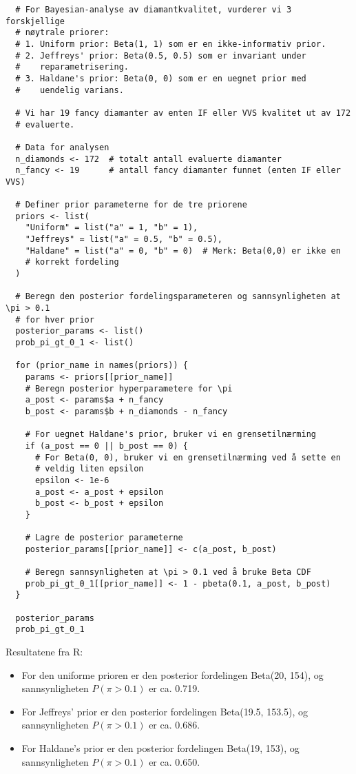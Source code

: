 \documentclass{article}
\begin{document}
\begin{verbatim}
  # For Bayesian-analyse av diamantkvalitet, vurderer vi 3 forskjellige 
  # nøytrale priorer:
  # 1. Uniform prior: Beta(1, 1) som er en ikke-informativ prior.
  # 2. Jeffreys' prior: Beta(0.5, 0.5) som er invariant under 
  #    reparametrisering.
  # 3. Haldane's prior: Beta(0, 0) som er en uegnet prior med 
  #    uendelig varians.
  
  # Vi har 19 fancy diamanter av enten IF eller VVS kvalitet ut av 172 
  # evaluerte.
  
  # Data for analysen
  n_diamonds <- 172  # totalt antall evaluerte diamanter
  n_fancy <- 19      # antall fancy diamanter funnet (enten IF eller VVS)
  
  # Definer prior parameterne for de tre priorene
  priors <- list(
    "Uniform" = list("a" = 1, "b" = 1),
    "Jeffreys" = list("a" = 0.5, "b" = 0.5),
    "Haldane" = list("a" = 0, "b" = 0)  # Merk: Beta(0,0) er ikke en 
    # korrekt fordeling
  )
  
  # Beregn den posterior fordelingsparameteren og sannsynligheten at \pi > 0.1
  # for hver prior
  posterior_params <- list()
  prob_pi_gt_0_1 <- list()
  
  for (prior_name in names(priors)) {
    params <- priors[[prior_name]]
    # Beregn posterior hyperparametere for \pi
    a_post <- params$a + n_fancy
    b_post <- params$b + n_diamonds - n_fancy
    
    # For uegnet Haldane's prior, bruker vi en grensetilnærming
    if (a_post == 0 || b_post == 0) {
      # For Beta(0, 0), bruker vi en grensetilnærming ved å sette en 
      # veldig liten epsilon
      epsilon <- 1e-6
      a_post <- a_post + epsilon
      b_post <- b_post + epsilon
    }
    
    # Lagre de posterior parameterne
    posterior_params[[prior_name]] <- c(a_post, b_post)
    
    # Beregn sannsynligheten at \pi > 0.1 ved å bruke Beta CDF
    prob_pi_gt_0_1[[prior_name]] <- 1 - pbeta(0.1, a_post, b_post)
  }
  
  posterior_params
  prob_pi_gt_0_1
  \end{verbatim}
  

Resultatene fra R:

\begin{itemize}
    \item For den uniforme prioren er den posterior fordelingen Beta(20, 154), og sannsynligheten \(P(\pi > 0.1)\) er ca. 0.719.
    \item For Jeffreys' prior er den posterior fordelingen Beta(19.5, 153.5), og sannsynligheten \(P(\pi > 0.1)\) er ca. 0.686.
    \item For Haldane's prior er den posterior fordelingen Beta(19, 153), og sannsynligheten \(P(\pi > 0.1)\) er ca. 0.650.
\end{itemize}
\end{document}
